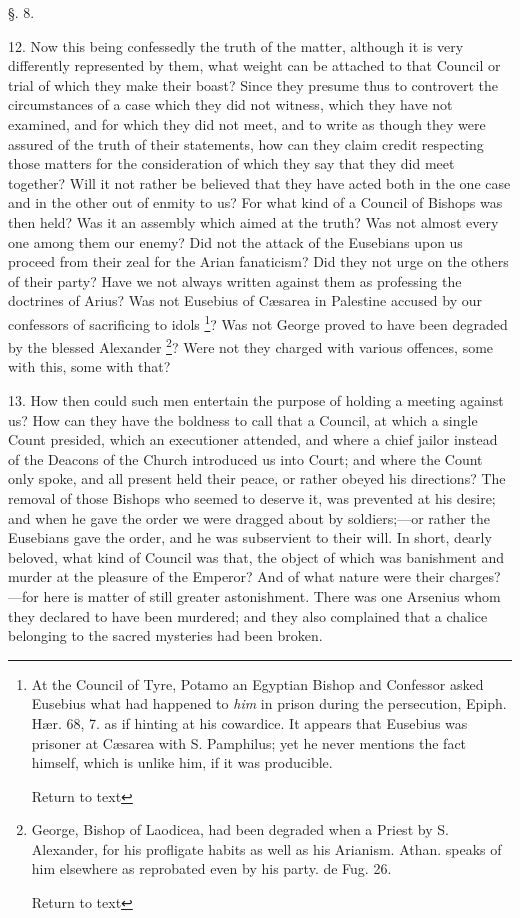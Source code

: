 §. 8.

12. Now this being confessedly the truth of the
matter, although it is very differently represented by them, what
weight can be attached to that Council or trial of which they make
their boast? Since they presume thus to controvert the circumstances
of a case which they did not witness, which they have not examined,
and for which they did not meet, and to write as though they were
assured of the truth of their statements, how can they claim credit
respecting those matters for the consideration of which they say that
they did meet together? Will it not rather be believed that they have
acted both in the one case and in the other out of enmity to us?
For what kind of a Council of Bishops was then held? Was it an
assembly which aimed at the truth? Was not almost every one among them
our enemy? Did not the attack of the Eusebians upon us proceed from
their zeal for the Arian fanaticism? Did they not urge on the others
of their party? Have we not always written against them as professing
the doctrines of Arius? Was not Eusebius of Cæsarea in Palestine
accused by our confessors of sacrificing to idols \footnote{At the Council of Tyre, Potamo an Egyptian Bishop and Confessor asked
Eusebius what had happened to \emph{him} in prison during the
persecution, Epiph. Hær. 68, 7. as if hinting at his cowardice. It
appears that Eusebius was prisoner at Cæsarea with S. Pamphilus; yet
he never mentions the fact himself, which is unlike him, if it was
producible.

Return to text}? Was not George proved to have been degraded by the blessed
Alexander \footnote{George, Bishop of Laodicea, had been degraded when a Priest by S.
Alexander, for his profligate habits as well as his Arianism. Athan.
speaks of him elsewhere as reprobated even by his party. de Fug. 26.

Return to text}? Were not they
charged with various offences, some with this, some with that?

13. How then could such men entertain the purpose
of holding a meeting against us? How can they have the boldness to
call that a Council, at which a single Count presided, which an
executioner attended, and where a chief jailor instead of the Deacons
of the Church introduced us into Court; and where the Count only
spoke, and all present held their peace, or rather obeyed his
directions? The removal of those Bishops who seemed to deserve it, was
prevented at his desire; and when he gave the order we were dragged
about by soldiers;—or rather the Eusebians gave the order, and he
was subservient to their will. In short, dearly beloved, what kind of
Council was that, the object of which was banishment and murder at the
pleasure of the Emperor? And of what nature were their charges?—for
here is matter of still greater astonishment. There was one Arsenius
whom they declared to have been murdered; and they also complained
that a chalice belonging to the sacred mysteries had been broken.

